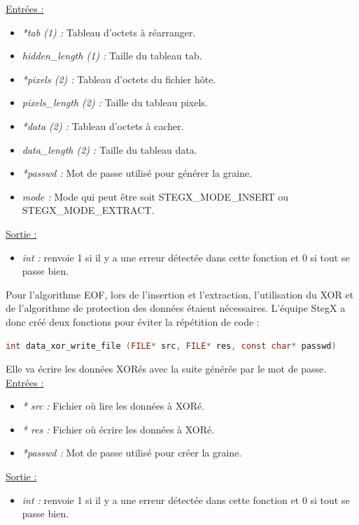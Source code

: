 \documentclass[11pt]{article}
\begin{document}
\underline{Entrées :}
\begin{itemize}
\item \textit{*tab (1) :} Tableau d'octets à réarranger. 
\item \textit{hidden\_length (1) :} Taille du tableau tab.
\item \textit{*pixels (2) :} Tableau d'octets du fichier hôte. 
\item \textit{pixels\_length (2) :} Taille du tableau pixels. 
\item \textit{*data (2) :} Tableau d'octets à cacher. 
\item \textit{data\_length (2) :} Taille du tableau data. 
\item \textit{*passwd :} Mot de passe utilisé pour générer la graine. 
\item \textit{mode :} Mode qui peut être soit STEGX\_MODE\_INSERT ou 
STEGX\_MODE\_EXTRACT. 
\end{itemize}
\underline{Sortie :} 
\begin{itemize}
\item \textit{int :} renvoie 1 si il y a une erreur détectée dans cette 
fonction et 0 si tout se passe bien.  
\newline 
\end{itemize}

Pour l'algorithme EOF, lors de l'insertion et l'extraction, l'utilisation 
du XOR et de l'algorithme de protection des données étaient nécessaires. 
L'équipe StegX a donc créé deux fonctions pour éviter la répétition de code : 

\begin{lstlisting}[language=c]
int data_xor_write_file (FILE* src, FILE* res, const char* passwd)
\end{lstlisting}

Elle va écrire les données XORés avec la suite générée par le mot de passe. 
\newline
\underline{Entrées :}
\begin{itemize}
\item \textit{* src :} Fichier où lire les données à XORé. 
\item \textit{* res :} Fichier où écrire les données à XORé. 
\item \textit{*passwd :} Mot de passe utilisé pour créer la graine. 
\end{itemize}
\underline{Sortie :} 
\begin{itemize}
\item \textit{int :} renvoie 1 si il y a une erreur détectée dans cette 
fonction et 0 si tout se passe bien. 
\newline 
\end{itemize}
\end{document}
